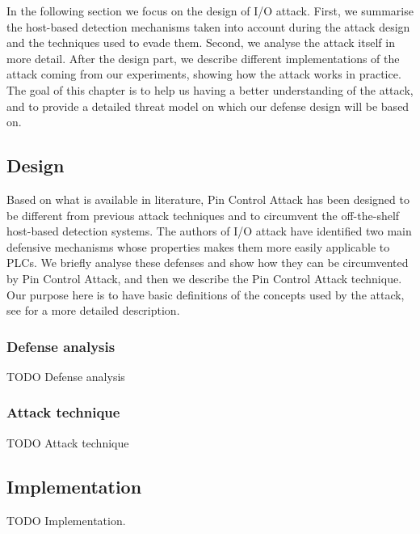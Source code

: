 In the following section we focus on the design of I/O attack. First, we summarise the host-based detection mechanisms taken into account
during the attack design and the techniques used to evade them. Second, we analyse the attack itself in more detail.
After the design part, we describe different implementations of the attack coming from our experiments,
showing how the attack works in practice. The goal of this chapter is to help us having a better understanding of the attack,
and to provide a detailed threat model on which our defense design will be based on.


\subsection{Design}

Based on what is available in literature, Pin Control Attack has been designed to be different from previous attack techniques and to
circumvent the off-the-shelf host-based detection systems. The authors of I/O attack have identified two main defensive mechanisms whose properties
makes them more easily applicable to PLCs. We briefly analyse these defenses and show how they can be circumvented by Pin Control Attack,
and then we describe the Pin Control Attack technique. Our purpose here is to have basic definitions of the concepts used by the attack,
see \cite{ghostplc} for a more detailed description.


\subsubsection{Defense analysis}

TODO Defense analysis


\subsubsection{Attack technique}

TODO Attack technique


\subsection{Implementation}

TODO Implementation.
